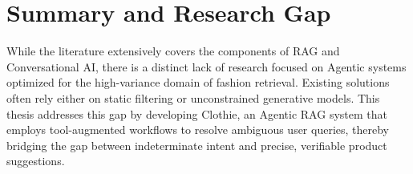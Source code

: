 \section{Summary and Research Gap}

While the literature extensively covers the components of RAG and Conversational AI, there is a distinct lack of research focused on Agentic systems optimized for the high-variance domain of fashion retrieval. Existing solutions often rely either on static filtering or unconstrained generative models. This thesis addresses this gap by developing Clothie, an Agentic RAG system that employs tool-augmented workflows to resolve ambiguous user queries, thereby bridging the gap between indeterminate intent and precise, verifiable product suggestions.